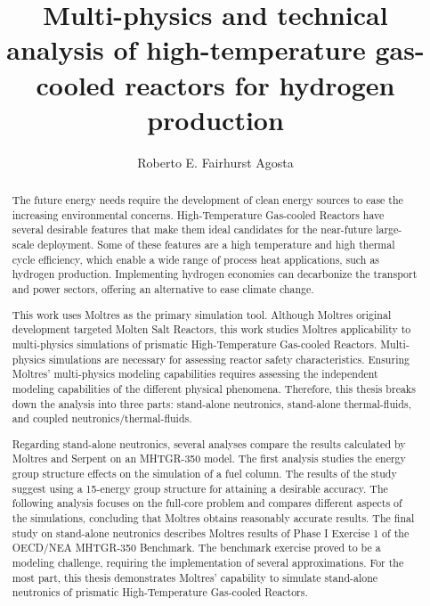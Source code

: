 \documentclass[edeposit,fullpage]{uiucthesis2018}
\title{Multi-physics and technical analysis of high-temperature gas-cooled reactors for hydrogen production}
\author{Roberto E. Fairhurst Agosta}
\begin{document}
\maketitle

\frontmatter
\begin{abstract}

The future energy needs require the development of clean energy sources to ease the increasing environmental concerns.
High-Temperature Gas-cooled Reactors have several desirable features that make them ideal candidates for the near-future large-scale deployment.
Some of these features are a high temperature and high thermal cycle efficiency, which enable a wide range of process heat applications, such as hydrogen production.
Implementing hydrogen economies can decarbonize the transport and power sectors, offering an alternative to ease climate change.

This work uses Moltres as the primary simulation tool.
Although Moltres original development targeted Molten Salt Reactors, this work studies Moltres applicability to multi-physics simulations of prismatic High-Temperature Gas-cooled Reactors.
Multi-physics simulations are necessary for assessing reactor safety characteristics.
Ensuring Moltres' multi-physics modeling capabilities requires assessing the independent modeling capabilities of the different physical phenomena.
Therefore, this thesis breaks down the analysis into three parts: stand-alone neutronics, stand-alone thermal-fluids, and coupled neutronics/thermal-fluids.

Regarding stand-alone neutronics, several analyses compare the results calculated by Moltres and Serpent on an MHTGR-350 model.
The first analysis studies the energy group structure effects on the simulation of a fuel column.
The results of the study suggest using a 15-energy group structure for attaining a desirable accuracy.
The following analysis focuses on the full-core problem and compares different aspects of the simulations, concluding that Moltres obtains reasonably accurate results.
The final study on stand-alone neutronics describes Moltres results of Phase I Exercise 1 of the OECD/NEA MHTGR-350 Benchmark.
The benchmark exercise proved to be a modeling challenge, requiring the implementation of several approximations.
For the most part, this thesis demonstrates Moltres' capability to simulate stand-alone neutronics of prismatic High-Temperature Gas-cooled Reactors.


\end{abstract}
\end{document}
